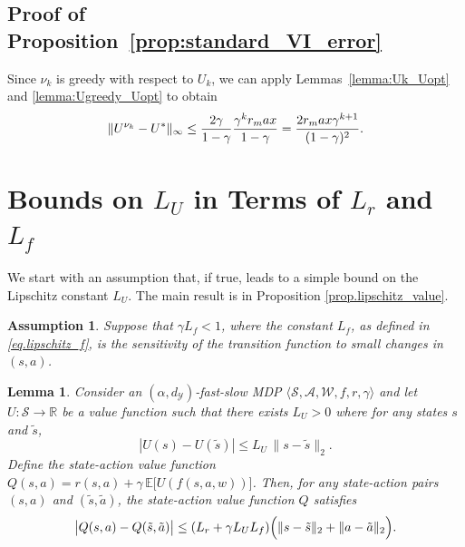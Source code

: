 \documentclass[11pt, notitlepage]{article}
\newcommand{\E}{\mathbb{E}}
\newcommand{\R}{\mathbb{R}}
\newcommand{\1}{\mathbbm{1}}
\newtheorem{assumption}{Assumption}
\newtheorem{lemma}{Lemma}[section]
\begin{document}
\subsection{Proof of Proposition~\ref{prop:standard_VI_error}}
\label{proof:standard_VI_error}
Since $\nu_k$ is greedy with respect to $U_k$, we can apply Lemmas~\ref{lemma:Uk_Uopt} and \ref{lemma:Ugreedy_Uopt} to obtain
\begin{equation*}
    \|U^{\nu_{k}} - U^*\|_\infty \leq \frac{2\gamma}{1-\gamma} \frac{ \gamma^k r_\textnormal{max}}{1-\gamma} = \frac{2 r_\textnormal{max} \gamma^{k+1}}{(1-\gamma)^2}.
\end{equation*}
























\section{Bounds on $L_U$ in Terms of $L_r$ and $L_f$}
\label{appendix:bounds_on_LU}

We start with an assumption that, if true, leads to a simple bound on the Lipschitz constant $L_U$. The main result is in Proposition \ref{prop.lipschitz_value}.
\begin{assumption}
\label{assumption:smallLf}
Suppose that $\gamma L_f < 1$, where the constant $L_f$, as defined in \eqref{eq.lipschitz_f}, is the sensitivity of the transition function to small changes in $(s,a)$.
\end{assumption}
    



\begin{lemma} \label{lemma.lipschitz_U_to_Q}
    Consider an $(\alpha, d_\mathcal{Y})$-fast-slow MDP $\langle \mathcal{S}, \mathcal{A}, \mathcal{W}, f, r, \gamma \rangle$ and let $U:\mathcal{S} \rightarrow \R$ be a value function such that there exists $L_U > 0$ where for any states $s$ and $\tilde{s}$,
    \begin{equation}
        |U(s) - U(\tilde{s})| \leq L_U \, \|s - \tilde{s}\|_2.
        \label{eq:lipschitz_U_to_Q_assumption}
    \end{equation}
    Define the state-action value function $Q(s,a) = r(s,a) + \gamma \, \E\bigl[U(f(s,a,w))\bigr]$. Then, for any state-action pairs $(s,a)$ and $(\tilde{s},\tilde{a})$, the state-action value function $Q$ satisfies
    \begin{align*}
        \bigl| Q(s,a) - Q(\tilde{s},\tilde{a}) \bigr|
        \leq (L_r + \gamma L_U L_f) \Bigl(\|s-\tilde{s}\|_2 + \|a-\tilde{a}\|_2 \Bigr).
    \end{align*}
\end{lemma}
\end{document}
